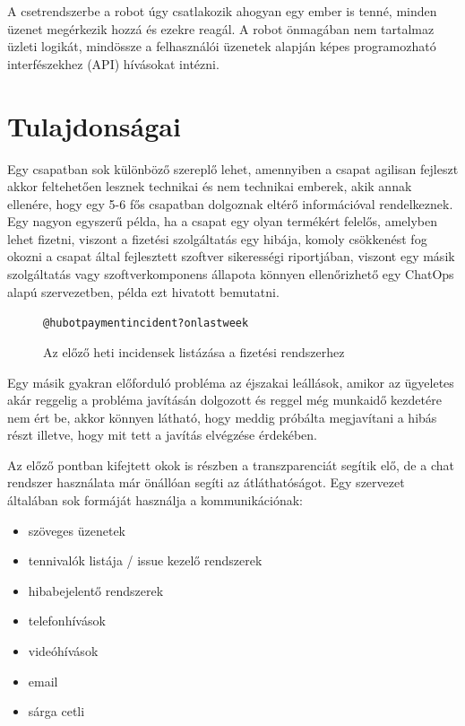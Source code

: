 A csetrendszerbe a robot úgy csatlakozik ahogyan egy ember is tenné, minden üzenet megérkezik hozzá és ezekre reagál. A robot önmagában nem tartalmaz üzleti logikát, mindössze a felhasználói üzenetek alapján képes programozható interfészekhez (API) hívásokat intézni.

\section{Tulajdonságai}

\label{subsection:better_communication}
Egy csapatban sok különböző szereplő lehet, amennyiben a csapat agilisan fejleszt akkor feltehetően lesznek technikai és nem technikai emberek, akik annak ellenére, hogy egy 5-6 fős csapatban dolgoznak eltérő információval rendelkeznek. Egy nagyon egyszerű példa, ha a csapat egy olyan termékért felelős, amelyben lehet fizetni, viszont a fizetési szolgáltatás egy hibája, komoly csökkenést fog okozni a csapat által fejlesztett szoftver sikerességi riportjában, viszont egy másik szolgáltatás vagy szoftverkomponens állapota könnyen ellenőrizhető egy ChatOps alapú szervezetben,  példa ezt hivatott bemutatni.

\begin{figure}
    \begin{alltt}
@hubot payment incident? on last week
    \end{alltt}
    \caption[DUMMY]%
    {Az előző heti incidensek listázása a fizetési rendszerhez}%
    \label{fig:get_outage_for_payment}
\end{figure}

Egy másik gyakran előforduló probléma az éjszakai leállások, amikor az ügyeletes akár reggelig a probléma javításán dolgozott és reggel még munkaidő kezdetére nem ért be, akkor könnyen látható, hogy meddig próbálta megjavítani a hibás részt illetve, hogy mit tett a javítás elvégzése érdekében.


Az előző pontban kifejtett okok is részben a transzparenciát segítik elő, de a chat rendszer használata már önállóan segíti az átláthatóságot.
Egy szervezet általában sok formáját használja a kommunikációnak:

\begin{itemize}
  \item szöveges üzenetek
  \item tennivalók listája / issue kezelő rendszerek
  \item hibabejelentő rendszerek
  \item telefonhívások
  \item videóhívások
  \item email
  \item sárga cetli
\end{itemize}

